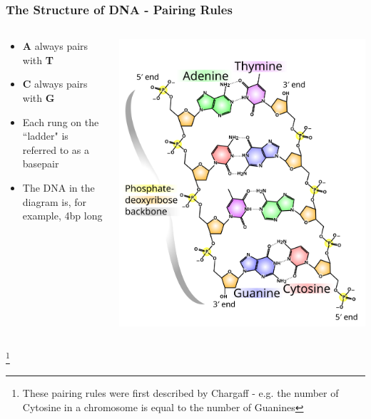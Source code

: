 \documentclass{beamer}
\newcommand\blfootnote[1]{%
	\begingroup
	\renewcommand\thefootnote{}\footnote{#1}%
	\addtocounter{footnote}{-1}%
	\endgroup
}
\begin{document}
	
	
	\begin{frame}
		\frametitle{The Structure of DNA - Pairing Rules}
		\begin{columns}
			\begin{column}{0.5\textwidth}
			
				\small		
				\begin{itemize}
					\item \textbf{A} always pairs with \textbf{T}
					\item \textbf{C} always pairs with \textbf{G}
					
					\vspace{10pt}
					\item Each rung on the ``ladder" is referred to as a basepair
					\item The DNA in the diagram is, for example, 4bp long
					

				\end{itemize}
				
				
			\end{column}
			\begin{column}{0.6\textwidth}
				\centering \includegraphics[keepaspectratio, width  =\textwidth]{img/DNA_chemistry}  
				
			\end{column}
		\end{columns}
		
		\blfootnote{These pairing rules were first described by Chargaff - e.g. the number of Cytosine in a chromosome is equal to the number of Guanines}
	\end{frame}
	
\end{document}

